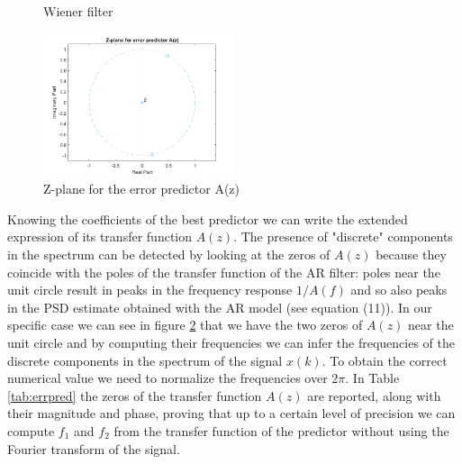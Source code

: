 \documentclass[a4paper, 12pt]{report}
\begin{document}
\begin{figure}[H]
	\caption{Wiener filter}
	\label{fig:wiener}
\end{figure}

\begin{figure}[H]
	\centering
	\includegraphics[width=0.5\textwidth]{zplane}
	\caption{Z-plane for the error predictor A(z)}
	\label{fig:zpln}
\end{figure}

Knowing the coefficients of the best predictor we can write the extended expression of its transfer function $A(z)$. The presence of "discrete" components in the spectrum can be detected by looking at the zeros of $A(z)$ because they coincide with the poles of the transfer function of the AR filter: poles near the unit circle result in peaks in the frequency response $1/A(f)$ and so also peaks in the PSD estimate obtained with the AR model (see equation (11)).  In our specific case we can see in figure \ref{fig:zpln} that we have the two zeros of $A(z)$ near the unit circle and by computing their frequencies we can infer the frequencies of the discrete components in the spectrum of the signal $x(k)$. To obtain the correct numerical value we need to normalize the frequencies over $2\pi$.
In Table \ref{tab:errpred} the zeros of the transfer function $A(z)$ are reported, along with their magnitude and phase, proving that up to a certain level of precision we can compute $f_1$ and $f_2$ from the transfer function of the predictor without using the Fourier transform of the signal.
\end{document}
